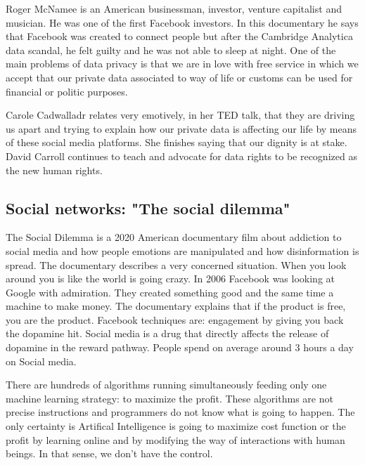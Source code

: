  Roger McNamee is an American businessman, investor, venture capitalist and musician.
 He was one of the first Facebook investors. In this documentary he says that 
 Facebook was created to connect people but after the Cambridge Analytica data scandal, he felt guilty and 
 he was not able to sleep at night. 
 One of the main problems of data privacy is that we are in love with free service in which   we accept 
 that our private data associated to way of life or customs can be used for financial or politic purposes. 
 
 Carole Cadwalladr relates very emotively, in her TED talk, that they are driving us apart
 and trying to explain how our private data  is affecting our life by means of these social media platforms. 
 She finishes saying that our dignity is at stake. 
 David Carroll continues to teach and advocate for data rights to be recognized as the new human rights. 
 
   
     
        
\subsection*{Social networks: "The social dilemma"}
The Social Dilemma is a 2020 American documentary film about 
addiction to social media and how people emotions are manipulated  
and how disinformation is spread.
The documentary describes a very concerned situation. 
When you look around you is like the world is going crazy. 
In 2006 Facebook was looking at Google with admiration. 
They created something good and the same time a machine to make money.  
The documentary explains that if the  product is free, you are the product.  
Facebook techniques are: engagement by  giving you back the dopamine hit. 
Social media is a drug that directly affects the release of dopamine in the reward pathway. 
People spend on average around 3 hours a day on Social media. 
  
  
There are hundreds of algorithms running simultaneously feeding  
only one machine learning strategy: to maximize the profit.
These algorithms are not 
precise instructions and programmers do not know what is going to happen.
The only certainty is Artifical Intelligence is going to maximize 
cost function or the profit by learning online and by modifying the 
way of interactions with human beings. 
In that sense, we don't have the control. 
  
